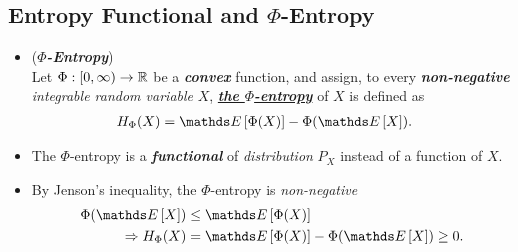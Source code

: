\documentclass[11pt]{article}
\begin{document}
\subsection{Entropy Functional and $\Phi$-Entropy}
\begin{itemize}
\item \begin{definition}(\textbf{\emph{$\Phi$-Entropy}})\citep{boucheron2013concentration}\\
Let $\Phi: [0, \infty) \rightarrow {\mathbb R}$ be a \textbf{\emph{convex}} function, and assign, to every \emph{\textbf{non-negative} integrable random variable} $X$, \underline{\textbf{\emph{the $\Phi$-entropy}}} of $X$ is defined as 
\begin{align}
H_{\Phi}(X) &= \E{}{\Phi(X)} - \Phi(\E{}{X}). \label{def: phi_entropy}
\end{align}
\end{definition}

\item \begin{remark}
The $\Phi$-entropy is a \emph{\textbf{functional}} of \emph{distribution} $P_{X}$ instead of a function of $X$.
\end{remark}

\item \begin{remark}
By Jenson's inequality, the $\Phi$-entropy is \emph{non-negative}
\begin{align*}
\Phi(\E{}{X}) &\le \E{}{\Phi(X)}\\
\Rightarrow H_{\Phi}(X) &= \E{}{\Phi(X)} - \Phi(\E{}{X}) \ge 0.
\end{align*} 
\end{remark}


\end{itemize}
\end{document}
